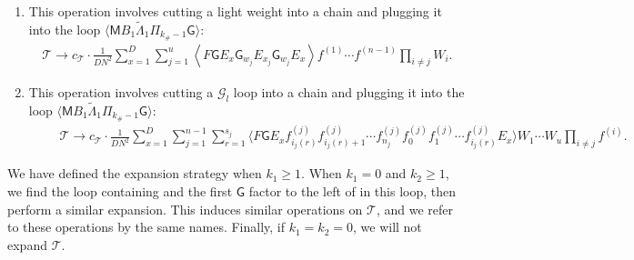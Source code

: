 \documentclass[10pt,reqno]{amsart}
\numberwithin{equation}{section}
\numberwithin{figure}{section}
\theoremstyle{plain} %
\theoremstyle{definition} %
\newcommand{\wt}{\widetilde}
\newcommand{\cT}{\mathcal T}
\newcommand{\sG}{\mathsf G}
\newcommand{\sM}{\mathsf M}
\newcommand{\scT}{{\mathscr{T}}}
\renewcommand{\geq}{\ge}
\newcommand{\pa}[1]{\left({#1}\right)}
\newcommand{\avg}[1]{\langle #1 \rangle}
\newcommand{\tLambda}{{\wt{\Lambda}}}
\newcommand{\splug}[1]{\mathsf{Plug}_{#1}}
\newcommand{\tl}{\tLambda}
\numberwithin{equation}{section}
\begin{document}
\begin{enumerate}
        \item[$\splug{1}$:] This operation involves cutting a light weight into a chain and plugging it into the loop $\avg{\sM  B_1 \tLambda_1 \Pi_{k_{\#}-1}\sG}$: 
        \begin{equation}\label{splug1_def}
            \begin{aligned}
                \cT \to c_{\cT} \cdot \frac{1}{D N^2} \sum_{x=1}^D \sum_{j=1}^u\left\langle F \sG E_x \sG_{w_j} E_{x_j} \sG_{w_j} E_x\right\rangle f^{(1)} \cdots f^{(n-1)} \prod_{i \neq j} W_i.
            \end{aligned}
        \end{equation}
        \item[$\splug{2}$:] This operation involves cutting a $\mathscr{G}_l$ loop into a chain and plugging it into the loop $\avg{\sM  B_1 \tLambda_1 \Pi_{k_{\#}-1}\sG}$:
        \begin{equation}\label{splug2_def}
            \begin{aligned}
          \qquad  \cT \to c_{\cT} \cdot \frac{1}{D N^2} \sum_{x=1}^D \sum_{j=1}^{n-1} \sum_{r=1}^{s_j}\avg{ F \sG E_x f_{i_j\pa{r}}^{(j)} f_{i_j\pa{r}+1}^{(j)} \cdots f_{n_j}^{(j)} f_0^{(j)} f_1^{(j)} \cdots f_{i_j\pa{r}}^{(j)} E_x} W_1 \cdots W_u \prod_{i \neq j} f^{(i)}.
            \end{aligned}
        \end{equation}
    \end{enumerate}

We have defined the expansion strategy when $k_1\ge 1$. When $k_1=0$ and $k_2\geq 1$, we find the loop containing \smash{$\tl_2$} and the first $\sG$ factor to the left of \smash{$\tl_2$} in this loop, then perform a similar expansion. This induces similar operations on $\scT$, and we refer to these operations by the same names. Finally, if $k_1=k_2=0$, we will not expand $\cT$.
\end{document}
